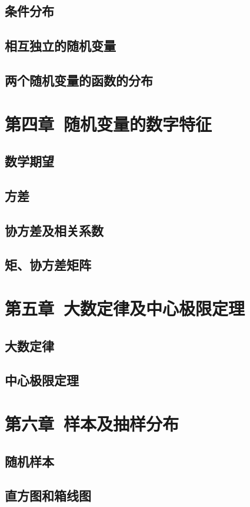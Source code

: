 \documentclass[UTF8]{ctexart}
\begin{document}
	\subsection{条件分布}
	\subsection{相互独立的随机变量}
	\subsection{两个随机变量的函数的分布}
	\section{第四章\ 随机变量的数字特征}
	\subsection{数学期望}
	\subsection{方差}
	\subsection{协方差及相关系数}
	\subsection{矩、协方差矩阵}
	\section{第五章\ 大数定律及中心极限定理}
	\subsection{大数定律}
	\subsection{中心极限定理}
	\section{第六章\ 样本及抽样分布}
	\subsection{随机样本}
	\subsection{直方图和箱线图}
\end{document}
